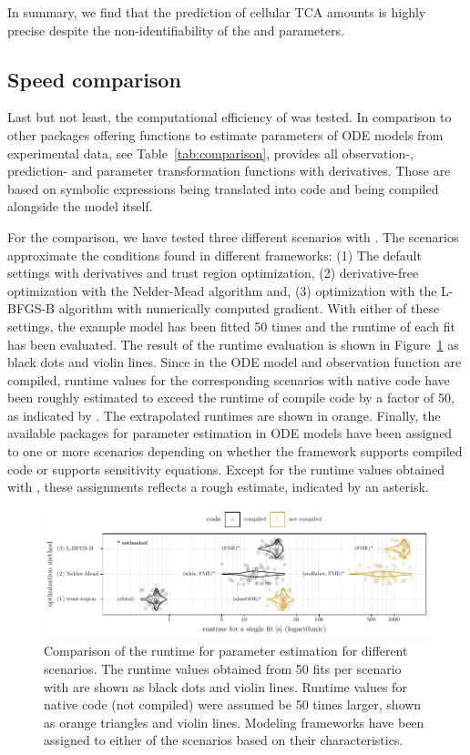 \documentclass[article]{jss}
\begin{document}
In summary, we find that the prediction of cellular TCA amounts is highly
precise despite the non-identifiability of the  and
 parameters.

\subsection{Speed comparison}

Last but not least, the computational efficiency of  was tested. In comparison to other  packages offering functions to estimate parameters of ODE models from experimental data, see Table~\ref{tab:comparison},  provides all observation-, prediction- and parameter transformation functions with derivatives. Those are based on symbolic expressions being translated into  code and being compiled alongside the model itself.

For the comparison, we have tested three different scenarios with . The scenarios approximate the conditions found in different frameworks: (1) The default settings with derivatives and trust region optimization, (2) derivative-free optimization with the Nelder-Mead algorithm and, (3) optimization with the L-BFGS-B algorithm with numerically computed gradient. With either of these settings, the example model has been fitted 50 times and the runtime of each fit has been evaluated. The result of the runtime evaluation is shown in Figure~\ref{fig:comparison} as black dots and violin lines. Since in  the ODE model and observation function are compiled, runtime values for the corresponding scenarios with native  code have been roughly estimated to exceed the runtime of compile code by a factor of 50, as indicated by \cite{deSolve}. The extrapolated runtimes are shown in orange. Finally, the available packages for parameter estimation in ODE models have been assigned to one or more scenarios depending on whether the framework supports compiled code or supports sensitivity equations. Except for the runtime values obtained with , these assignments reflects a rough estimate, indicated by an asterisk.  

\begin{figure}[t!]
\centering
\includegraphics[width=6in]{Figures/figure10}
\caption{Comparison of the runtime for parameter estimation for different scenarios. The runtime values obtained from 50 fits per scenario with  are shown as black dots and violin lines. Runtime values for native  code (not compiled) were assumed be 50 times larger, shown as orange triangles and violin lines. Modeling frameworks have been assigned to either of the scenarios based on their characteristics.
\label{fig:comparison}}
\end{figure}
\end{document}

